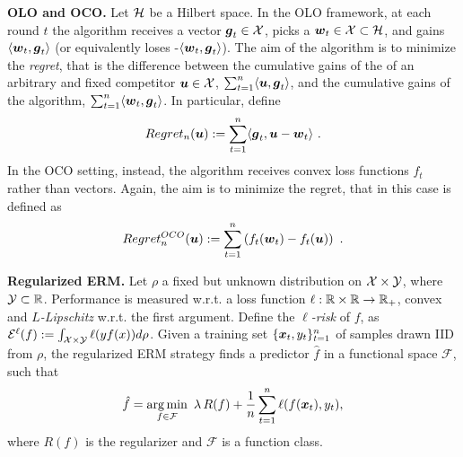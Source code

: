 \vspace{0.2cm}\noindent\textbf{\ac{OLO} and \ac{OCO}.}
Let $\mathcal{H}$ be a Hilbert space. In the \ac{OLO} framework, at each round $t$ the algorithm receives a vector $\boldsymbol{g}_t \in \mathcal{X}$, picks a $\boldsymbol{w}_t \in \mathcal{X} \subset \mathcal{H}$, and gains $\langle \boldsymbol{w}_t,\boldsymbol{g}_t \rangle$ (or equivalently loses -$\langle \boldsymbol{w}_t,\boldsymbol{g}_t \rangle$).
The aim of the algorithm is to minimize the \emph{regret}, that is the difference between the cumulative gains of the 
of an arbitrary and fixed competitor $\boldsymbol{u} \in \mathcal{X}$, $\sum_{t=1}^n \langle \boldsymbol{u},\boldsymbol{g}_t \rangle$, and 
the cumulative gains of the algorithm, $\sum_{t=1}^n \langle \boldsymbol{w}_t,\boldsymbol{g}_t \rangle$.
In particular, define
\[
Regret_n(\boldsymbol{u}) := \sum_{t=1}^n \langle \boldsymbol{g}_t , \boldsymbol{u} - \boldsymbol{w}_t \rangle~.
\]
In the \ac{OCO} setting, instead, the algorithm receives convex loss functions $f_t$ rather than vectors.
Again, the aim is to minimize the regret, that in this case is defined as
\[
Regret^{OCO}_n(\boldsymbol{u}) := \sum_{t=1}^n \left(f_t(\boldsymbol{w}_t) -f_t(\boldsymbol{u})\right)~.
\]

\vspace{0.2cm}\noindent\textbf{Regularized ERM.}
Let $\rho$ a fixed but unknown distribution on $\mathcal{X} \times \mathcal{Y}$, where $\mathcal{Y} \subset \mathbb{R}$.
Performance is measured w.r.t. a loss function $\ell: \mathbb{R} \times \mathbb{R} \rightarrow \mathbb{R}_+$, convex and \emph{$L$-Lipschitz} w.r.t. the first argument.
Define the \emph{$\ell$-risk} of $f$, as $\mathcal{E}^{\ell}(f):=\int_{\mathcal{X} \times \mathcal{Y}} \ell(y f(x)) d \rho$.
Given a training set $\{\boldsymbol{x}_t,y_t\}_{t=1}^n$ of samples drawn \ac{IID} from $\rho$, the regularized \ac{ERM} strategy finds a predictor $\hat{f}$ in a functional space $\mathcal{F}$, such that
\[
\hat{f}= \operatorname*{arg\,min}_{f \in \mathcal{F}} \ \lambda\, R(f) + \frac{1}{n} \sum_{t=1}^n \ell(f(\boldsymbol{x}_t),y_t),
\]
where $R(f)$ is the regularizer and $\mathcal{F}$ is a function class.